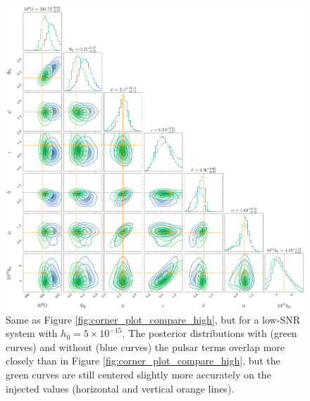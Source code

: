 \documentclass[fleqn,usenatbib,useAMS]{mnras}
\begin{document}
\begin{figure}
	\includegraphics[width=\textwidth, height =\textwidth ]{images/corner_lowSNR_compare_n4000}
	\caption{Same as Figure \ref{fig:corner_plot_compare_high}, but for a low-SNR system with $h_0 = 5 \times 10^{-15}$. The posterior distributions with (green curves) and without (blue curves) the pulsar terms overlap more closely than in Figure \ref{fig:corner_plot_compare_high}, but the green curves are still centered slightly more accurately on the injected values (horizontal and vertical orange lines).}
	\label{fig:corner_plot_compare_low}
\end{figure}
\end{document}

